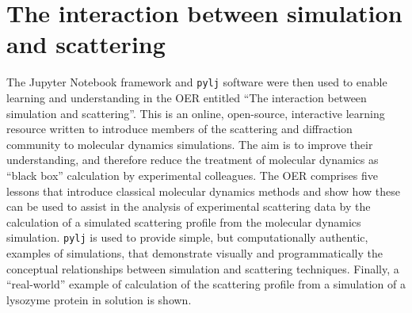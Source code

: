 \section{The interaction between simulation and scattering}
\label{sec:sim_and_scat}
The Jupyter Notebook framework and \texttt{pylj} software were then used to enable learning and understanding in the OER entitled ``The interaction between simulation and scattering''.\autocite[available at \href{https://pythoninchemistry.org/sim_and_scat}{pythoninchemistry.org/sim\_and\_scat}]{mccluskey_introduction_2019,mccluskey_pythoninchemistry/sim_and_scat_2019}
This is an online, open-source, interactive learning resource written to introduce members of the scattering and diffraction community to molecular dynamics simulations.
The aim is to improve their understanding, and therefore reduce the treatment of molecular dynamics as ``black box'' calculation by experimental colleagues.
The OER comprises five lessons that introduce classical molecular dynamics methods and show how these can be used to assist in the analysis of experimental scattering data by the calculation of a simulated scattering profile from the molecular dynamics simulation.
\texttt{pylj} is used to provide simple, but computationally authentic, examples of simulations, that demonstrate visually and programmatically the conceptual relationships between simulation and scattering techniques.
Finally, a ``real-world'' example of calculation of the scattering profile from a simulation of a lysozyme protein in solution is shown.


